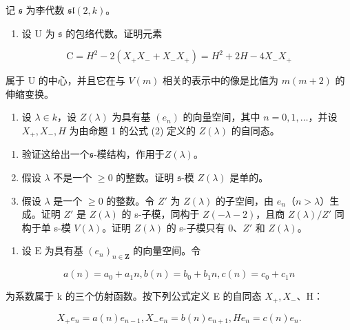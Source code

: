 
记 \(\mathfrak{s}\) 为李代数 \(\mathfrak{sl}(2,k)\)。

\begin{enumerate}
\def\labelenumi{\arabic{enumi})}
\tightlist
\item
  设 \(\mathrm{U}\) 为 \(\mathfrak{s}\) 的包络代数。证明元素
\end{enumerate}

\[
\mathrm{C} = H ^ {2} - 2 (X _ {+} X _ {-} + X _ {-} X _ {+}) = H ^ {2} + 2 H - 4 X _ {-} X _ {+}
\]

属于 U 的中心，并且它在与 \(V(m)\) 相关的表示中的像是比值为 \(m(m+2)\) 的伸缩变换。

\begin{enumerate}
\def\labelenumi{\arabic{enumi})}
\setcounter{enumi}{1}
\tightlist
\item
  设 \(\lambda \in k\)，设 \(Z(\lambda)\) 为具有基 \((e_n)\) 的向量空间，其中 \(n = 0,1,\ldots\)，并设 \(X_{+}, X_{-}, H\) 为由命题 1 的公式 (2) 定义的 \(Z(\lambda)\) 的自同态。
\end{enumerate}

\begin{enumerate}
\def\labelenumi{\alph{enumi})}
\item
  验证这给出一个\(\mathfrak{s}\)-模结构，作用于\(Z(\lambda)\)。
\item
  假设 \(\lambda\) 不是一个 \(\geq 0\) 的整数。证明 \(\mathfrak{s}\)-模 \(Z(\lambda)\) 是单的。
\item
  假设 \(\lambda\) 是一个 \(\geq 0\) 的整数。令 \(Z'\) 为 \(Z(\lambda)\) 的子空间，由 \(e_{n}\)（\(n > \lambda\)）生成。证明 \(Z'\) 是 \(Z(\lambda)\) 的 s-子模，同构于 \(Z(-\lambda - 2)\)，且商 \(Z(\lambda)/Z'\) 同构于单 s-模 \(V(\lambda)\)。证明 \(Z(\lambda)\) 的 s-子模只有 0、\(Z'\) 和 \(Z(\lambda)\)。
\end{enumerate}

\begin{enumerate}
\def\labelenumi{\arabic{enumi})}
\setcounter{enumi}{2}
\tightlist
\item
  设 \(\mathrm{E}\) 为具有基 \((e_n)_{n\in \mathbf{Z}}\) 的向量空间。令
\end{enumerate}

\[
a (n) = a _ {0} + a _ {1} n, b (n) = b _ {0} + b _ {1} n, c (n) = c _ {0} + c _ {1} n
\]

为系数属于 k 的三个仿射函数。按下列公式定义 E 的自同态 \(X_{+}, X_{-}\)、H：

\[
X _ {+} e _ {n} = a (n) e _ {n - 1}, X _ {-} e _ {n} = b (n) e _ {n + 1}, H e _ {n} = c (n) e _ {n}.
\]

